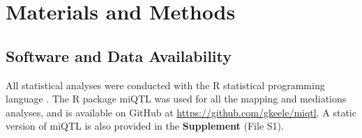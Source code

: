 \section{Materials and Methods}
\label{sec:materials:methods}





\subsection{Software and Data Availability}

All statistical analyses were conducted with the R statistical programming language \citep{RSoftware2018}. The R package miQTL was used for all the mapping and mediations analyses, and is available on GitHub at \url{https://github.com/gkeele/miqtl}. A static version of miQTL is also provided in the \textbf{Supplement} (File S1).